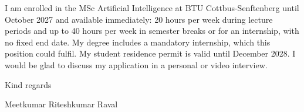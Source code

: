 \documentclass[a4paper,11pt]{article}
\begin{document}
I am enrolled in the MSc Artificial Intelligence at BTU Cottbus-Senftenberg until October 2027 and available immediately: 20 hours per week during lecture periods and up to 40 hours per week in semester breaks or for an internship, with no fixed end date. My degree includes a mandatory internship, which this position could fulfil. My student residence permit is valid until December 2028. I would be glad to discuss my application in a personal or video interview.

\vspace{1.2em}

Kind regards

\vspace{1.6em}

Meetkumar Riteshkumar Raval
\end{document}
